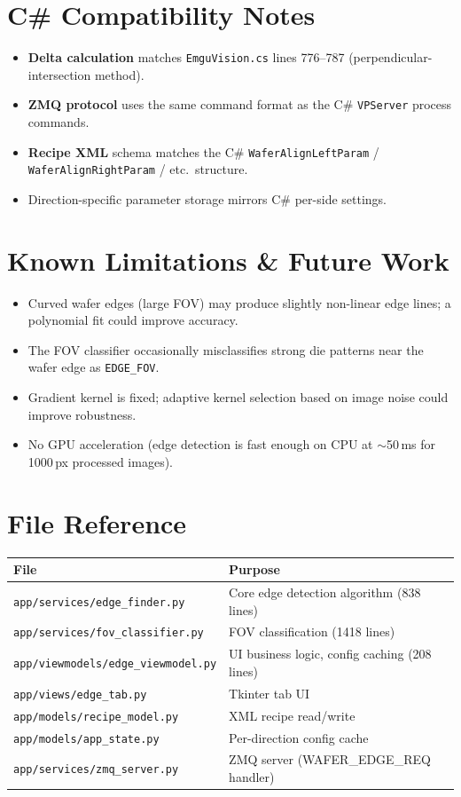 \documentclass[11pt,a4paper]{article}
\begin{document}
\section{C\# Compatibility Notes}

\begin{itemize}
\item \textbf{Delta calculation} matches \texttt{EmguVision.cs} lines 776--787 (perpendicular-intersection method).
\item \textbf{ZMQ protocol} uses the same command format as the C\# \texttt{VPServer} process commands.
\item \textbf{Recipe XML} schema matches the C\# \texttt{WaferAlignLeftParam} / \texttt{WaferAlignRightParam} / etc.\ structure.
\item Direction-specific parameter storage mirrors C\# per-side settings.
\end{itemize}

\section{Known Limitations \& Future Work}
\begin{itemize}
\item Curved wafer edges (large FOV) may produce slightly non-linear edge lines; a polynomial fit could improve accuracy.
\item The FOV classifier occasionally misclassifies strong die patterns near the wafer edge as \texttt{EDGE\_FOV}.
\item Gradient kernel is fixed; adaptive kernel selection based on image noise could improve robustness.
\item No GPU acceleration (edge detection is fast enough on CPU at $\sim$50\,ms for 1000\,px processed images).
\end{itemize}

\section{File Reference}
\begin{longtable}{p{5.5cm}p{8cm}}\toprule
\textbf{File} & \textbf{Purpose}\\\midrule
\texttt{app/services/edge\_finder.py} & Core edge detection algorithm (838 lines)\\
\texttt{app/services/fov\_classifier.py} & FOV classification (1418 lines)\\
\texttt{app/viewmodels/edge\_viewmodel.py} & UI business logic, config caching (208 lines)\\
\texttt{app/views/edge\_tab.py} & Tkinter tab UI\\
\texttt{app/models/recipe\_model.py} & XML recipe read/write\\
\texttt{app/models/app\_state.py} & Per-direction config cache\\
\texttt{app/services/zmq\_server.py} & ZMQ server (WAFER\_EDGE\_REQ handler)\\\bottomrule
\end{longtable}
\end{document}
